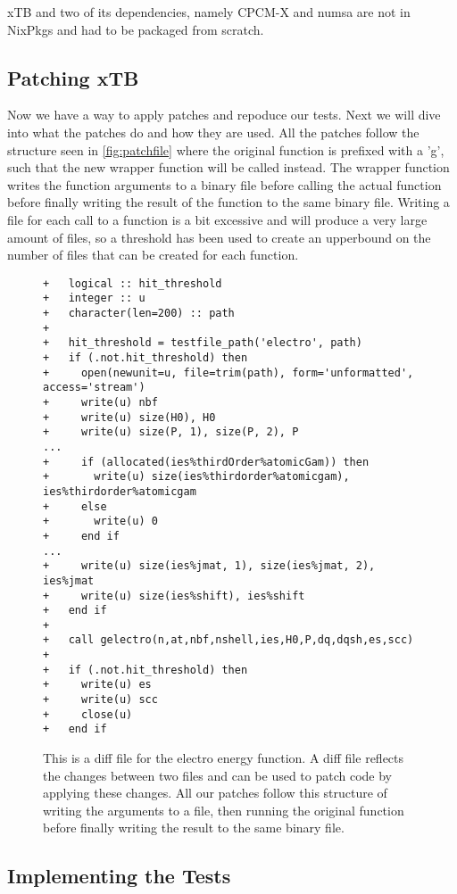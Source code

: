 xTB and two of its dependencies, namely CPCM-X and numsa are not in NixPkgs and had to be packaged from scratch.

\subsection{Patching xTB}

Now we have a way to apply patches and repoduce our tests. Next we will dive into what the patches do and how they are used.
All the patches follow the structure seen in \autoref{fig:patchfile} where the original function is prefixed with a 'g', such that the new wrapper function will be called instead. The wrapper function writes the function arguments to a binary file before calling the actual function before finally writing the result of the function to the same binary file.
Writing a file for each call to a function is a bit excessive and will produce a very large amount of files, so a threshold has been used to create an upperbound on the number of files that can be created for each function.

\begin{figure}[H]
\begin{verbatim}
+   logical :: hit_threshold
+   integer :: u
+   character(len=200) :: path
+
+   hit_threshold = testfile_path('electro', path)
+   if (.not.hit_threshold) then
+     open(newunit=u, file=trim(path), form='unformatted', access='stream')
+     write(u) nbf
+     write(u) size(H0), H0
+     write(u) size(P, 1), size(P, 2), P
...
+     if (allocated(ies%thirdOrder%atomicGam)) then
+       write(u) size(ies%thirdorder%atomicgam), ies%thirdorder%atomicgam
+     else
+       write(u) 0
+     end if
...
+     write(u) size(ies%jmat, 1), size(ies%jmat, 2), ies%jmat
+     write(u) size(ies%shift), ies%shift
+   end if
+
+   call gelectro(n,at,nbf,nshell,ies,H0,P,dq,dqsh,es,scc)
+
+   if (.not.hit_threshold) then
+     write(u) es
+     write(u) scc
+     close(u)
+   end if
\end{verbatim}
\caption{This is a diff file for the electro energy function. A diff file reflects the changes between two files and can be used to patch code by applying these changes. All our patches follow this structure of writing the arguments to a file, then running the original function before finally writing the result to the same binary file.}
\label{fig:patchfile}
\end{figure}

\subsection{Implementing the Tests}

